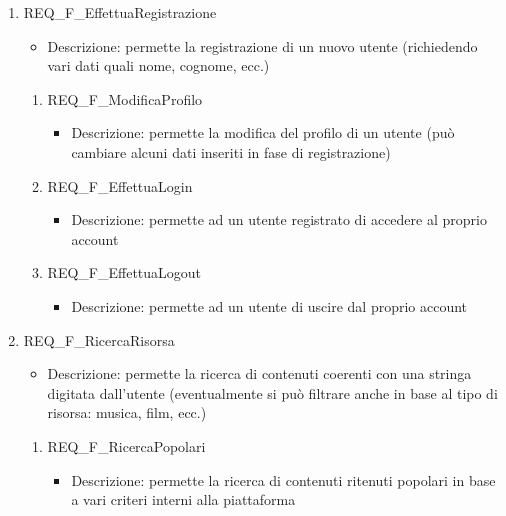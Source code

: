 \begin{enumerate}
	
	\item REQ\_F\_EffettuaRegistrazione	
		\begin{itemize}	
			\item Descrizione: permette la registrazione di un nuovo utente (richiedendo vari dati quali nome, cognome, ecc.)
		\end{itemize}
		\begin{enumerate}[label*=\arabic*.]
		\item REQ\_F\_ModificaProfilo
			\begin{itemize}	
				\item Descrizione: permette la modifica del profilo di un utente (può cambiare alcuni dati inseriti in fase di registrazione)
			\end{itemize}

		\item REQ\_F\_EffettuaLogin
			\begin{itemize}	
				\item Descrizione: permette ad un utente registrato di accedere al proprio account
			\end{itemize}

		\item REQ\_F\_EffettuaLogout
			\begin{itemize}	
				\item Descrizione: permette ad un utente di uscire dal proprio account
			\end{itemize}
		\end{enumerate}

	\item REQ\_F\_RicercaRisorsa
		\begin{itemize}	
			\item Descrizione: permette la ricerca di contenuti coerenti con una stringa digitata dall'utente (eventualmente si può filtrare anche in base al tipo di risorsa: musica, film, ecc.)
		\end{itemize}
		\begin{enumerate}[label*=\arabic*.]
			\item REQ\_F\_RicercaPopolari
			\begin{itemize}
				\item Descrizione: permette la ricerca di contenuti ritenuti popolari in base a vari criteri interni alla piattaforma 
			\end{itemize}	
		\end{enumerate}		


\end{enumerate}
